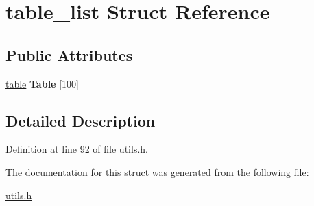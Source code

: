 \hypertarget{structtable__list}{\section{table\-\_\-list Struct Reference}
\label{structtable__list}
}
\subsection*{Public Attributes}
\begin{DoxyCompactItemize}
\item 
\hypertarget{structtable__list_a8e9bdeffd3866346b6a4736f33bf317d}{\hyperlink{structtable}{table} {\bfseries Table} \mbox{[}100\mbox{]}}\label{structtable__list_a8e9bdeffd3866346b6a4736f33bf317d}

\end{DoxyCompactItemize}


\subsection{Detailed Description}


Definition at line 92 of file utils.\-h.



The documentation for this struct was generated from the following file\-:\begin{DoxyCompactItemize}
\item 
\hyperlink{utils_8h}{utils.\-h}\end{DoxyCompactItemize}
